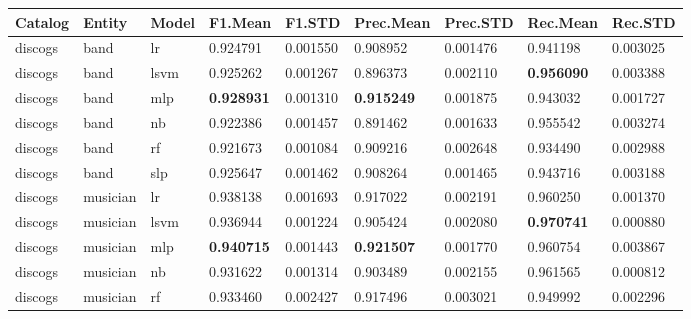 \documentclass[epsfig,a4paper,11pt,titlepage,twoside,openany]{book}
\begin{document}
\begin{longtable}{|l|l|l|l|l|l|l|l|l|}
\hline
Catalog     & Entity   & Model & F1.Mean                            & F1.STD   & Prec.Mean                          & Prec.STD & Rec.Mean                           & Rec.STD  \\ \hline
discogs     & band     & lr    & 0.924791                           & 0.001550 & 0.908952                           & 0.001476 & 0.941198                           & 0.003025 \\
discogs     & band     & lsvm  & 0.925262                           & 0.001267 & 0.896373                           & 0.002110 & \textbf{0.956090} & 0.003388 \\
discogs     & band     & mlp   & \textbf{0.928931} & 0.001310 & \textbf{0.915249} & 0.001875 & 0.943032                           & 0.001727 \\
discogs     & band     & nb    & 0.922386                           & 0.001457 & 0.891462                           & 0.001633 & 0.955542                           & 0.003274 \\
discogs     & band     & rf    & 0.921673                           & 0.001084 & 0.909216                           & 0.002648 & 0.934490                           & 0.002988 \\
discogs     & band     & slp   & 0.925647                           & 0.001462 & 0.908264                           & 0.001465 & 0.943716                           & 0.003188 \\ \hline
discogs     & musician & lr    & 0.938138                           & 0.001693 & 0.917022                           & 0.002191 & 0.960250                           & 0.001370 \\
discogs     & musician & lsvm  & 0.936944                           & 0.001224 & 0.905424                           & 0.002080 & \textbf{0.970741} & 0.000880 \\
discogs     & musician & mlp   & \textbf{0.940715} & 0.001443 & \textbf{0.921507} & 0.001770 & 0.960754                           & 0.003867 \\
discogs     & musician & nb    & 0.931622                           & 0.001314 & 0.903489                           & 0.002155 & 0.961565                           & 0.000812 \\
discogs     & musician & rf    & 0.933460                           & 0.002427 & 0.917496                           & 0.003021 & 0.949992                           & 0.002296 \\

\end{longtable}
\end{document}
